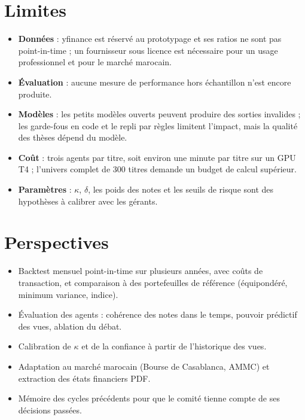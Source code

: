 \documentclass[11pt,a4paper]{report}
\begin{document}
\section{Limites}
\begin{itemize}
  \item \textbf{Données} : yfinance est réservé au prototypage et ses ratios ne sont pas point-in-time ; un fournisseur
        sous licence est nécessaire pour un usage professionnel et pour le marché marocain.
  \item \textbf{Évaluation} : aucune mesure de performance hors échantillon n'est encore produite.
  \item \textbf{Modèles} : les petits modèles ouverts peuvent produire des sorties invalides ; les garde-fous en code
        et le repli par règles limitent l'impact, mais la qualité des thèses dépend du modèle.
  \item \textbf{Coût} : trois agents par titre, soit environ une minute par titre sur un GPU T4 ; l'univers complet
        de 300 titres demande un budget de calcul supérieur.
  \item \textbf{Paramètres} : $\kappa$, $\delta$, les poids des notes et les seuils de risque sont des hypothèses à
        calibrer avec les gérants.
\end{itemize}

\section{Perspectives}
\begin{itemize}
  \item Backtest mensuel point-in-time sur plusieurs années, avec coûts de transaction, et comparaison à des
        portefeuilles de référence (équipondéré, minimum variance, indice).
  \item Évaluation des agents : cohérence des notes dans le temps, pouvoir prédictif des vues, ablation du débat.
  \item Calibration de $\kappa$ et de la confiance à partir de l'historique des vues.
  \item Adaptation au marché marocain (Bourse de Casablanca, AMMC) et extraction des états financiers PDF.
  \item Mémoire des cycles précédents pour que le comité tienne compte de ses décisions passées.
\end{itemize}

\end{document}
